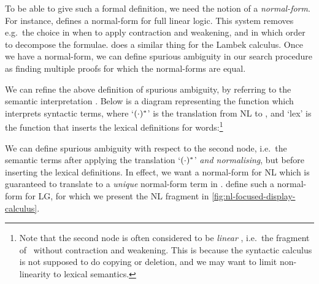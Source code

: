 To be able to give such a formal definition, we need the notion of a
\emph{normal-form}. For instance, \citet{andreoli1992} defines a
normal-form for full linear logic. This system removes e.g.\ the
choice in when to apply contraction and weakening, and in which order
to decompose the formulae. \citet{hepple1990} does a similar thing for
the Lambek calculus. Once we have a normal-form, we can define
spurious ambiguity in our search procedure as finding multiple proofs
for which the normal-forms are equal.

We can refine the above definition of spurious ambiguity, by referring
to the semantic interpretation \citep{capelletti2007,bastenhof2013}.
Below is a diagram representing the function which interprets
syntactic terms, where `$({\cdot})^*$' is the translation from NL to \lamPET,
and `lex' is the function that inserts the lexical definitions for
words:\footnote{%
  Note that the second node is often considered to be \emph{linear}
  \lamET, i.e.\ the fragment of \lamET\ without contraction and
  weakening. This is because the syntactic calculus is not supposed
  to do copying or deletion, and we may want to limit non-linearity to
  lexical semantics.
}
\begin{center}
\end{center}
We can define spurious ambiguity with respect to the second node,
i.e.\ the semantic terms after applying the translation `$({\cdot})^*$'
\emph{and normalising}, but before inserting the lexical definitions.
In effect, we want a normal-form for NL which is guaranteed to
translate to a \emph{unique} normal-form term in \lamET.
\citet{moortgat2012} define such a normal-form for LG, for which we
present the NL fragment in \autoref{fig:nl-focused-display-calculus}.



